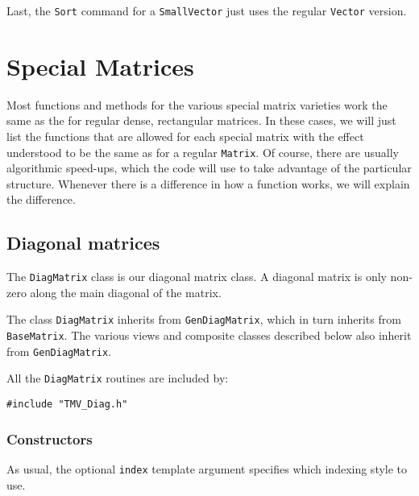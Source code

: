 \documentclass[twoside,letterpaper,11pt]{article}
\renewcommand{\tt}[1]{{\texttt {#1}}}
\begin{document}
Last, the \tt{Sort} command for a \tt{SmallVector} just uses the
regular \tt{Vector} version.

\newpage
\section{Special Matrices}

Most functions and methods for the various special matrix varieties work the same
as the for regular dense, rectangular matrices.  
In these cases, we will just list the functions
that are allowed for each special matrix with the
effect understood to be the same as for a regular \tt{Matrix}.  Of course, there are usually 
algorithmic speed-ups, which the code will use to take advantage of the 
particular structure.
Whenever there is a difference in how a function works,
we will explain the difference.

\subsection{Diagonal matrices}

The \tt{DiagMatrix} class is our diagonal matrix class.  
A diagonal matrix is only non-zero
along the main diagonal of the matrix.  

The class \tt{DiagMatrix} inherits from \tt{GenDiagMatrix},
which in turn inherits from \tt{BaseMatrix}.
The various views and composite classes described below
also inherit from \tt{GenDiagMatrix}.

All the \tt{DiagMatrix} routines are included by:
\begin{verbatim}
#include "TMV_Diag.h"
\end{verbatim}

\subsubsection{Constructors}

As usual, the optional \tt{index} template argument specifies which indexing
style to use.
\end{document}
